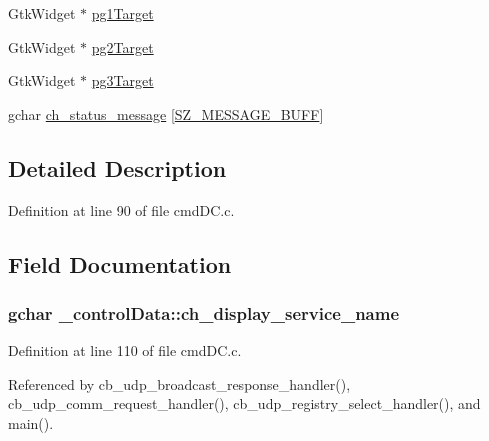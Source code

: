 \begin{DoxyCompactItemize}
\item 
Gtk\+Widget $\ast$ \hyperlink{struct__control_data_adb6c2830054c6309779d676082e94447}{pg1\+Target}
\item 
Gtk\+Widget $\ast$ \hyperlink{struct__control_data_a201f826ab99699df83a85c5e4572ffb2}{pg2\+Target}
\item 
Gtk\+Widget $\ast$ \hyperlink{struct__control_data_a67d45a0e9ba1fcaabea3600dfee830b9}{pg3\+Target}
\item 
gchar \hyperlink{struct__control_data_aa6d5e703090d185edd3e0b5224542ce5}{ch\+\_\+status\+\_\+message} \mbox{[}\hyperlink{gtk_d_s_8c_ab5903aa853c3769389e570c8490feb1e}{S\+Z\+\_\+\+M\+E\+S\+S\+A\+G\+E\+\_\+\+B\+U\+FF}\mbox{]}
\end{DoxyCompactItemize}


\subsection{Detailed Description}


Definition at line 90 of file cmd\+D\+C.\+c.



\subsection{Field Documentation}
\subsubsection[{\texorpdfstring{ch\+\_\+display\+\_\+service\+\_\+name}{ch_display_service_name}}]{\setlength{\rightskip}{0pt plus 5cm}gchar \+\_\+control\+Data\+::ch\+\_\+display\+\_\+service\+\_\+name}\hypertarget{struct__control_data_a94aa04264eafaa65a7a869a540bbdf93}{}\label{struct__control_data_a94aa04264eafaa65a7a869a540bbdf93}


Definition at line 110 of file cmd\+D\+C.\+c.



Referenced by cb\+\_\+udp\+\_\+broadcast\+\_\+response\+\_\+handler(), cb\+\_\+udp\+\_\+comm\+\_\+request\+\_\+handler(), cb\+\_\+udp\+\_\+registry\+\_\+select\+\_\+handler(), and main().

